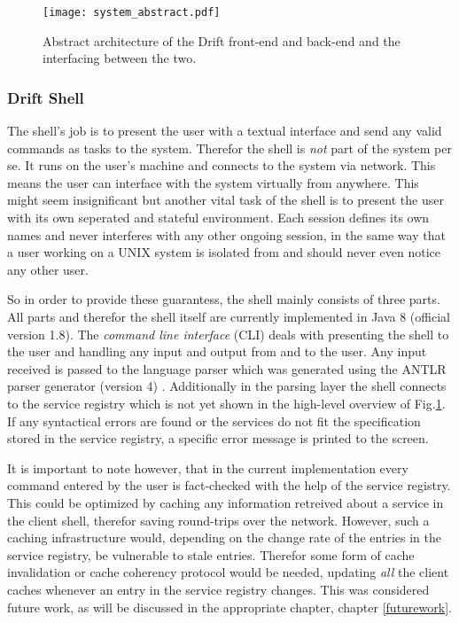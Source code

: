 \begin{figure}[h]
  \texttt{[image: system\_abstract.pdf]}
  \caption{Abstract architecture of the Drift front-end and back-end
           and the interfacing between the two.}
  \label{system-abstract}
\end{figure}

\subsubsection{Drift Shell}
\label{driftshell}

The shell's job is to present the user with a textual interface
and send any valid commands as tasks to the system. Therefor
the shell is \textit{not} part of the system per se. It runs
on the user's machine and connects to the system via network.
This means the user can interface with the system virtually from
anywhere.
This might seem insignificant but another vital task of
the shell is to present the user with its own
seperated and stateful environment. Each session defines its own
names and never interferes with any other ongoing session, in the
same way that a user working on a UNIX system is isolated from
and should never even notice any other user.

So in order to provide these guarantess, the shell mainly consists of
three parts. All parts and therefor the shell itself are currently
implemented in Java 8 (official version 1.8).
The \textit{command line interface} (CLI) deals with presenting
the shell to the user and handling any input and output from
and to the user. Any input received is passed to the
language parser which was generated using the ANTLR parser
generator (version 4) \cite{antlr}. Additionally in the
parsing layer the shell connects to the service registry which
is not yet shown in the high-level overview of Fig.\ref{system-abstract}.
If any syntactical errors are found or the services do not fit
the specification stored in the service registry, a specific error
message is printed to the screen.

It is important to note however, that in the current implementation
every command entered by the user is fact-checked with the help
of the service registry. This could be optimized by caching any
information retreived about a service in the client shell, therefor
saving round-trips over the network. However, such a caching
infrastructure would, depending on the change rate of the entries
in the service registry, be vulnerable to stale entries. Therefor
some form of cache invalidation or cache coherency protocol would
be needed, updating \textit{all} the client caches
whenever an entry in the service registry changes.
This was considered future work, as will be discussed in the
appropriate chapter, chapter \ref{futurework}.

